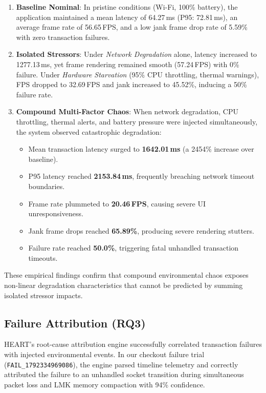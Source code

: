 \documentclass[conference]{IEEEtran}
\begin{document}
\begin{enumerate}
    \item \textbf{Baseline Nominal}: In pristine conditions (Wi-Fi, 100\% battery), the application maintained a mean latency of 64.27\,ms (P95: 72.81\,ms), an average frame rate of 56.65\,FPS, and a low jank frame drop rate of 5.59\% with zero transaction failures.
    \item \textbf{Isolated Stressors}: Under \textit{Network Degradation} alone, latency increased to 1277.13\,ms, yet frame rendering remained smooth (57.24\,FPS) with 0\% failure. Under \textit{Hardware Starvation} (95\% CPU throttling, thermal warnings), FPS dropped to 32.69\,FPS and jank increased to 45.52\%, inducing a 50\% failure rate.
    \item \textbf{Compound Multi-Factor Chaos}: When network degradation, CPU throttling, thermal alerts, and battery pressure were injected simultaneously, the system observed catastrophic degradation:
    \begin{itemize}
        \item Mean transaction latency surged to \textbf{1642.01\,ms} (a 2454\% increase over baseline).
        \item P95 latency reached \textbf{2153.84\,ms}, frequently breaching network timeout boundaries.
        \item Frame rate plummeted to \textbf{20.46\,FPS}, causing severe UI unresponsiveness.
        \item Jank frame drops reached \textbf{65.89\%}, producing severe rendering stutters.
        \item Failure rate reached \textbf{50.0\%}, triggering fatal unhandled transaction timeouts.
    \end{itemize}
\end{enumerate}

These empirical findings confirm that compound environmental chaos exposes non-linear degradation characteristics that cannot be predicted by summing isolated stressor impacts.

\subsection{Failure Attribution (RQ3)}
HEART's root-cause attribution engine successfully correlated transaction failures with injected environmental events. In our checkout failure trial (\texttt{FAIL\_1792334969086}), the engine parsed timeline telemetry and correctly attributed the failure to an unhandled socket transition during simultaneous packet loss and LMK memory compaction with 94\% confidence.
\end{document}
